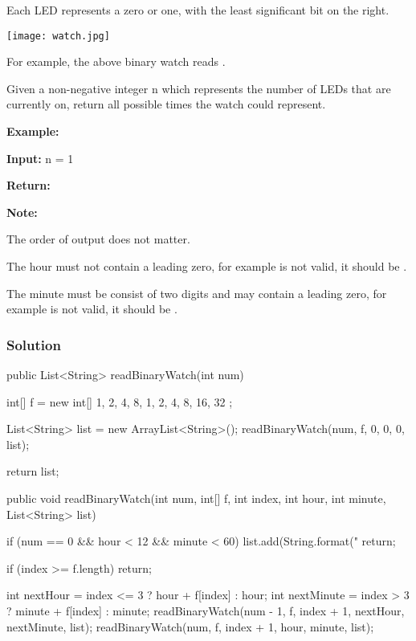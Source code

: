 Each LED represents a zero or one, with the least significant bit on the right.

\begin{center}
\texttt{[image: watch.jpg]}\\
\end{center}

For example, the above binary watch reads .

Given a non-negative integer n which represents the number of LEDs that are currently on, return all possible times the watch could represent.

\textbf{Example:}

\textbf{Input:} n = 1

\textbf{Return:} \code{["1:00", "2:00", "4:00", "8:00", "0:01", "0:02", "0:04", "0:08", "0:16", "0:32"]}

\textbf{Note:}

The order of output does not matter.

The hour must not contain a leading zero, for example  is not valid, it should be .

The minute must be consist of two digits and may contain a leading zero, for example  is not valid, it should be .

\subsubsection{Solution}
\begin{Code}
public List<String> readBinaryWatch(int num) {
    int[] f = new int[] {
            1, 2, 4, 8, 1, 2, 4, 8, 16, 32
    };

    List<String> list = new ArrayList<String>();
    readBinaryWatch(num, f, 0, 0, 0, list);

    return list;
}
\end{Code}

\newpage

\begin{Code}
public void readBinaryWatch(int num, int[] f, int index, int hour, int minute, List<String> list) {
    if (num == 0 && hour < 12 && minute < 60) {
        list.add(String.format("%
        return;
    }

    if (index >= f.length) {
        return;
    }

    int nextHour = index <= 3 ? hour + f[index] : hour;
    int nextMinute = index > 3 ? minute + f[index] : minute;
    readBinaryWatch(num - 1, f, index + 1, nextHour, nextMinute, list);
    readBinaryWatch(num, f, index + 1, hour, minute, list);
}
\end{Code}

